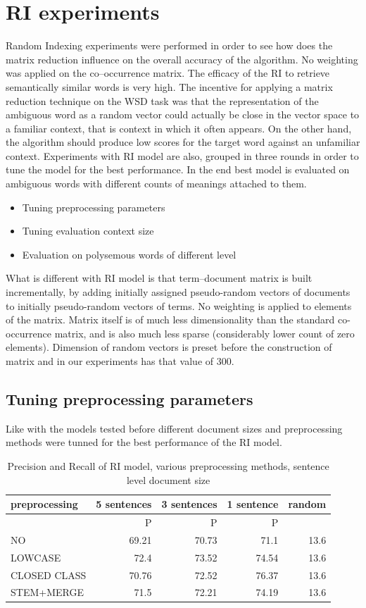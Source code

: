 \section{RI experiments} 
Random Indexing experiments were performed in order to see how does the matrix reduction influence on the overall accuracy of the algorithm. No weighting was applied on the co--occurrence matrix. The efficacy of the RI to retrieve semantically similar words is very high. 
 The incentive for applying a matrix reduction technique on the WSD task was that the representation of the ambiguous word as a random vector could actually be close in the vector space to a familiar context, that is context in which it often appears. On the other hand, the algorithm should produce low scores for the target word against an unfamiliar context. 
Experiments  with RI model are also, grouped in three rounds in order to tune
the model for the best performance. In the end best model is evaluated on ambiguous words with 
different counts of meanings attached to them.
\begin{itemize}
\item Tuning preprocessing parameters
\item Tuning evaluation context size
\item Evaluation on polysemous words of different level
\end{itemize}

What is different with RI model is that term--document matrix is built incrementally, by adding initially 
assigned pseudo-random vectors of documents to initially pseudo-random vectors of terms. No 
weighting is applied to elements of the matrix. Matrix itself is of much less dimensionality than the 
standard co-occurrence matrix, and is also much less sparse (considerably lower count of zero 
elements). 
 Dimension of random vectors is preset before the construction of matrix and in our 
experiments has that value of 300.

\subsection{Tuning preprocessing parameters}
Like with the models tested before different document sizes and preprocessing methods were tunned
for the best performance of the RI model. 

\begin{table}[h!]
\begin{tabular}{ l | r | r | r | r}
   preprocessing &  5 sentences & 3 sentences & 1 sentence  & random\\
\hline
	& P  &  P  &  P  &  \\
\hline\hline
 NO  & 69.21  & 70.73  &71.1 & 13.6 \\
LOWCASE  &72.4 & 73.52 & 74.54 &13.6   \\
CLOSED CLASS &70.76 & 72.52 & 76.37 &13.6   \\
STEM+MERGE & 71.5 & 72.21 & 74.19 & 13.6   \\
\end{tabular}
\caption{Precision and Recall of RI model, various preprocessing methods, sentence level document size}
\end{table}

